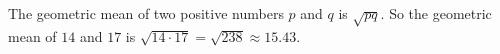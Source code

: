 The geometric mean of two positive numbers $p$ and $q$ is $\sqrt{pq}$. So the geometric mean of $14$ and $17$ is $\sqrt{14\cdot17}=\boxed{\sqrt{238}}\approx15.43$.
